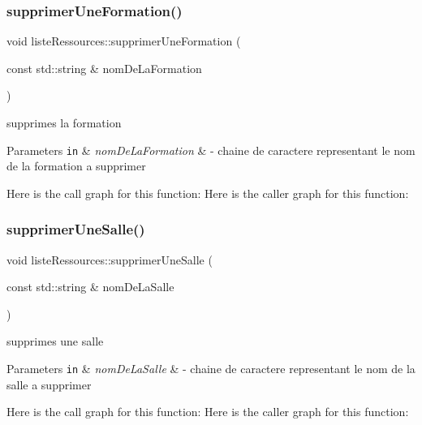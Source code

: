 \subsubsection{\texorpdfstring{supprimer\+Une\+Formation()}{supprimerUneFormation()}}
{\footnotesize\ttfamily void liste\+Ressources\+::supprimer\+Une\+Formation (\begin{DoxyParamCaption}\item[{const std\+::string \&}]{nom\+De\+La\+Formation }\end{DoxyParamCaption})}



supprimes la formation 


\begin{DoxyParams}[1]{Parameters}
\mbox{\tt in}  & {\em nom\+De\+La\+Formation} & -\/ chaine de caractere representant le nom de la formation a supprimer \\
\hline
\end{DoxyParams}
Here is the call graph for this function\+:
Here is the caller graph for this function\+:
\hypertarget{classliste_ressources_a364c27cbbbaa542d110d744e016cf092}{}\label{classliste_ressources_a364c27cbbbaa542d110d744e016cf092} 
\subsubsection{\texorpdfstring{supprimer\+Une\+Salle()}{supprimerUneSalle()}}
{\footnotesize\ttfamily void liste\+Ressources\+::supprimer\+Une\+Salle (\begin{DoxyParamCaption}\item[{const std\+::string \&}]{nom\+De\+La\+Salle }\end{DoxyParamCaption})}



supprimes une salle 


\begin{DoxyParams}[1]{Parameters}
\mbox{\tt in}  & {\em nom\+De\+La\+Salle} & -\/ chaine de caractere representant le nom de la salle a supprimer \\
\hline
\end{DoxyParams}
Here is the call graph for this function\+:
Here is the caller graph for this function\+:
\hypertarget{classliste_ressources_acf367bf8942e1578db883d066f1e0cf3}{}\label{classliste_ressources_acf367bf8942e1578db883d066f1e0cf3} 
